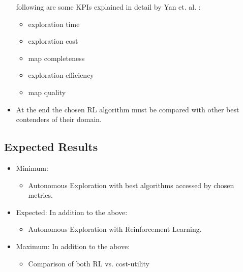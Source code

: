 \begin{itemize}
following are some KPIs explained in detail by Yan et. al. :
\begin{itemize}
  \item exploration time
  \item exploration cost
  \item map completeness
  \item exploration efficiency
  \item map quality
\end{itemize}

\item At the end the chosen RL algorithm must be compared with other best contenders of their domain.
\end{itemize}


\subsection{Expected Results}
\begin{itemize}
	\item Minimum:
	\begin{itemize}
		\item Autonomous Exploration with best algorithms accessed by chosen metrics.
	\end{itemize}
	\item Expected:
	In addition to the above:
	\begin{itemize}
		\item Autonomous Exploration with Reinforcement Learning.
	\end{itemize}
	\item Maximum:
	In addition to the above:
	\begin{itemize}
		\item Comparison of both RL vs. cost-utility
	\end{itemize}
\end{itemize}
